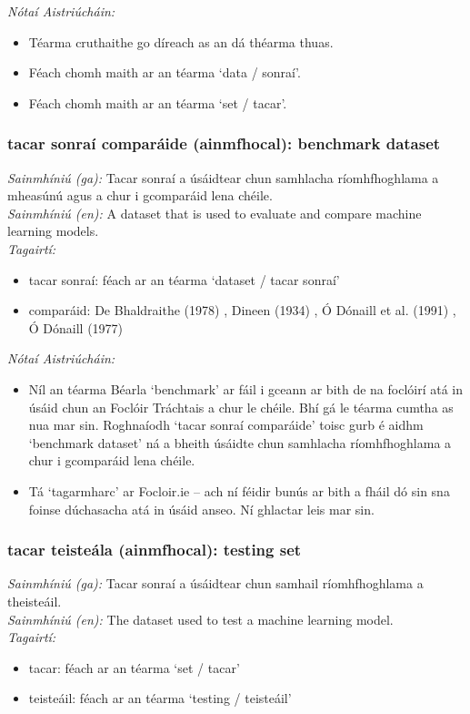 \documentclass{article}
\begin{document}
 \noindent \textit{Nótaí Aistriúcháin:}
\begin{itemize}
	\item Téarma cruthaithe go díreach as an dá théarma thuas.
	\item Féach chomh maith ar an téarma `data / sonraí'.
	\item Féach chomh maith ar an téarma `set / tacar'.
\end{itemize}


\subsubsection*{tacar sonraí comparáide (ainmfhocal): benchmark dataset}
 \noindent \textit{Sainmhíniú (ga):} Tacar sonraí a úsáidtear chun samhlacha ríomhfhoghlama a mheasúnú agus a chur i gcomparáid lena chéile.
\\
 \noindent \textit{Sainmhíniú (en):} A dataset that is used to evaluate and compare machine learning models.
\\
 \noindent \textit{Tagairtí:}
\begin{itemize}
	\item tacar sonraí: féach ar an téarma `dataset / tacar sonraí'
	\item comparáid: De Bhaldraithe (1978) \cite{de-bhaldraithe}, Dineen (1934) \cite{dineen}, Ó Dónaill et al. (1991) \cite{focloir-beag}, Ó Dónaill (1977) \cite{odonaill}
\end{itemize}

 \noindent \textit{Nótaí Aistriúcháin:}
\begin{itemize}
	\item Níl an téarma Béarla `benchmark' ar fáil i gceann ar bith de na foclóirí atá in úsáid chun an Foclóir Tráchtais a chur le chéile. Bhí gá le téarma cumtha as nua mar sin. Roghnaíodh `tacar sonraí comparáide' toisc gurb é aidhm `benchmark dataset' ná a bheith úsáidte chun samhlacha ríomhfhoghlama a chur i gcomparáid lena chéile.
	\item Tá `tagarmharc' ar Focloir.ie -- ach ní féidir bunús ar bith a fháil dó sin sna foinse dúchasacha atá in úsáid anseo. Ní ghlactar leis mar sin.
\end{itemize}


\subsubsection*{tacar teisteála (ainmfhocal): testing set}
 \noindent \textit{Sainmhíniú (ga):} Tacar sonraí a úsáidtear chun samhail ríomhfhoghlama a theisteáil.
\\
 \noindent \textit{Sainmhíniú (en):} The dataset used to test a machine learning model.
\\
 \noindent \textit{Tagairtí:}
\begin{itemize}
	\item tacar: féach ar an téarma `set / tacar'
	\item teisteáil: féach ar an téarma `testing / teisteáil'
\end{itemize}
\end{document}
